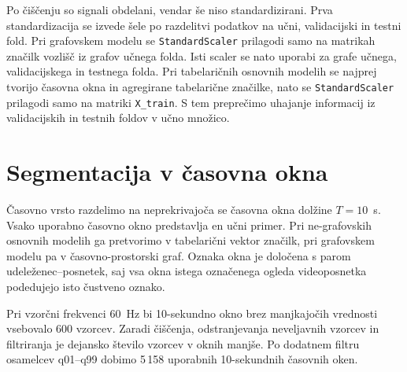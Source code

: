 Po čiščenju so signali obdelani, vendar še niso standardizirani.
Prva standardizacija se izvede šele po razdelitvi podatkov na učni, validacijski in testni fold.
Pri grafovskem modelu se \texttt{StandardScaler} prilagodi samo na matrikah značilk vozlišč iz grafov učnega folda.
Isti scaler se nato uporabi za grafe učnega, validacijskega in testnega folda.
Pri tabelaričnih osnovnih modelih se najprej tvorijo časovna okna in agregirane tabelarične značilke, nato se \texttt{StandardScaler} prilagodi samo na matriki \texttt{X\_train}.
S tem preprečimo uhajanje informacij iz validacijskih in testnih foldov v učno množico.

\section{Segmentacija v časovna okna}
\label{subsec:windowing}

Časovno vrsto razdelimo na neprekrivajoča se časovna okna dolžine $T=10$~s.
Vsako uporabno časovno okno predstavlja en učni primer.
Pri ne-grafovskih osnovnih modelih ga pretvorimo v tabelarični vektor značilk, pri grafovskem modelu pa v časovno-prostorski graf.
Oznaka okna je določena s parom udeleženec--posnetek, saj vsa okna istega označenega ogleda videoposnetka podedujejo isto čustveno oznako.

Pri vzorčni frekvenci 60~Hz bi 10-sekundno okno brez manjkajočih vrednosti vsebovalo 600 vzorcev.
Zaradi čiščenja, odstranjevanja neveljavnih vzorcev in filtriranja je dejansko število vzorcev v oknih manjše.
Po dodatnem filtru osamelcev q01--q99 dobimo 5\,158 uporabnih 10-sekundnih časovnih oken.


